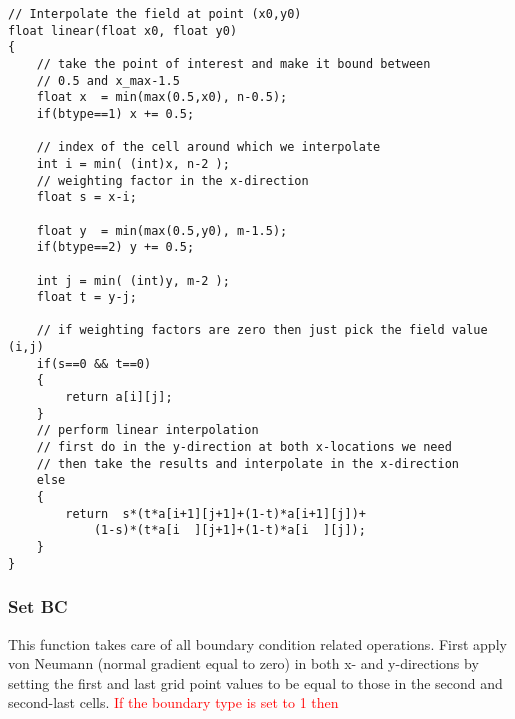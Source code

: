 \documentclass[notitlepage]{article}
\begin{document}
\begin{lstlisting}[style=myCpp]
// Interpolate the field at point (x0,y0)
float linear(float x0, float y0)
{
	// take the point of interest and make it bound between
	// 0.5 and x_max-1.5
	float x  = min(max(0.5,x0), n-0.5);
	if(btype==1) x += 0.5;
	
	// index of the cell around which we interpolate
	int i = min( (int)x, n-2 ); 
	// weighting factor in the x-direction
	float s = x-i;
	
	float y  = min(max(0.5,y0), m-1.5);
	if(btype==2) y += 0.5;
	
	int j = min( (int)y, m-2 );
	float t = y-j;
	
	// if weighting factors are zero then just pick the field value (i,j)
	if(s==0 && t==0)
	{
		return a[i][j];
	}
	// perform linear interpolation
	// first do in the y-direction at both x-locations we need
	// then take the results and interpolate in the x-direction
	else
	{
		return  s*(t*a[i+1][j+1]+(1-t)*a[i+1][j])+
			(1-s)*(t*a[i  ][j+1]+(1-t)*a[i  ][j]);
	}
}
\end{lstlisting}

\subsubsection{Set BC}

This function takes care of all boundary condition related operations.
First apply von Neumann (normal gradient equal to zero) in both
x- and y-directions by setting the first and last grid point values to be equal to
those in the second and second-last cells.
\textcolor{red}{
If the boundary type is set to 1 then
}
\end{document}

